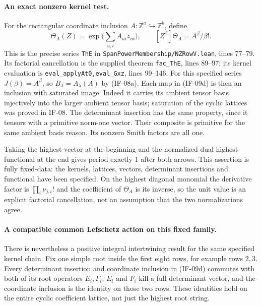 \paragraph{An exact nonzero kernel test.}
For the rectangular coordinate inclusion $A:\mathbb Z^a\hookrightarrow
\mathbb Z^b$, define
\[
 \Theta_A(Z)=\exp\bigl(\sum_{u,i}A_{ui}z_{ui}\bigr),\qquad
 [Z^\beta]\Theta_A=A^\beta/\beta!.
\]
This is the precise series \texttt{ThE} in
\texttt{SpanPowerMembership/NZRowV.lean}, lines 77--79.
Its factorial cancellation is the supplied theorem
\texttt{fac\_ThE}, lines 89--97; its kernel evaluation is
\texttt{eval\_applyAt0,eval\_Gxz}, lines 99--146.
For this specified series $J(\beta)=A^\beta$, so
$B_J=A_\lambda(A)$ by (IF-08a). Each map in (IF-09d) is then an
inclusion with saturated image. Indeed it carries its ambient tensor
basis injectively into the larger ambient tensor basis; saturation of
the cyclic lattices was proved in IF-08. The determinant insertion
has the same property, since it tensors with a primitive norm-one
vector. Their composite is primitive for the same ambient basis
reason. Its nonzero Smith factors are all one.

Taking the highest vector at the beginning and the normalized dual
highest functional at the end gives period exactly $1$ after both
arrows. This assertion is fully fixed-data: the kernels, lattices,
vectors, determinant insertions and functional have been specified.
On the highest diagonal monomial the derivative factor is
$\prod_i\nu_{j,i}!$ and the coefficient of $\Theta_A$ is its inverse,
so the unit value is an explicit factorial cancellation, not an
assumption that the two normalizations agree.

\paragraph{A compatible common Lefschetz action on this fixed family.}
There is nevertheless a positive integral intertwining result for the
same specified kernel chain. Fix one simple root inside the first eight
rows, for example rows $2,3$. Every determinant insertion and coordinate
inclusion in (IF-09d) commutes with both of its root operators $E_i,F_i$:
$E_i$ and $F_i$ kill a full determinant vector, and the coordinate
inclusion is the identity on those two rows. These identities hold on
the entire cyclic coefficient lattice, not just the highest root string.


